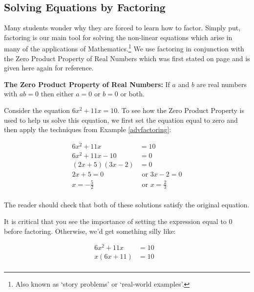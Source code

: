 \subsection{Solving Equations by Factoring}
\label{solveeqnsbyfactoring}

Many students wonder why they are forced to learn how to factor.  Simply put, factoring is our main tool for solving the non-linear equations which arise in many of the applications of Mathematics.\footnote{Also known as `story problems' or `real-world examples'.}  We use factoring in conjunction with the Zero Product Property of Real Numbers which was first stated on page \pageref{box:propertiesofzero} and is given here again for reference.

\begin{tcolorbox}
  
\textbf{The Zero Product Property of Real Numbers:}  If $a$ and $b$ are real numbers with $ab = 0$ then either $a = 0$ or $b = 0$ or both.

\end{tcolorbox}

Consider the equation $6x^2 + 11x = 10$.  To see how the Zero Product Property is used to help us solve this equation, we first set the equation equal to zero and then apply the techniques from Example \ref{advfactoring}:

\begin{align*}
6x^2 + 11x & = 10 \\
6x^2 + 11x - 10 & = 0 \tag{Subtract $10$ from both sides} \\
(2x+5)(3x-2) & = 0 \tag{Factor} \\
2x +5 = 0 & \text{ or } 3x -2 = 0 \tag{Zero Product Property with $a = 2x+5, b = 3x-2$} \\
x = -\frac{5}{2} & \text{ or } x = \frac{2}{3} \\
\end{align*}

The reader should check that both of these solutions satisfy the original equation.

It is critical that you see the importance of setting the expression equal to $0$ before factoring. Otherwise, we'd get something silly like:

\begin{align*}
6x^2 + 11x & = 10 \\
x(6x + 11) & = 10 & \tag{Factor} \\
\end{align*}

